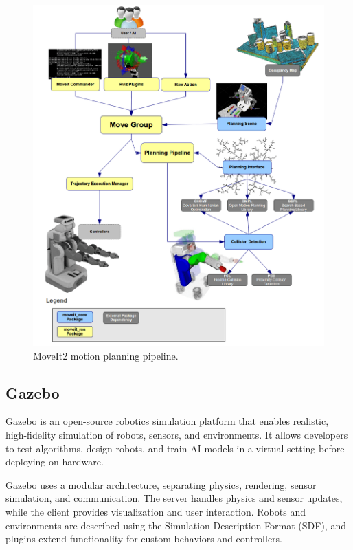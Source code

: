 \documentclass[12pt]{extarticle}
\begin{document}
\begin{figure}[htbp]
    \centering
    \includegraphics[width=\linewidth]{images/moveit_pipeline.png}
    \caption{MoveIt2 motion planning pipeline.}
    \label{fig:moveit_pipeline}
\end{figure}

\subsection{Gazebo}

Gazebo is an open-source robotics simulation platform that enables realistic, high-fidelity simulation of robots, sensors, and environments. It allows developers to test algorithms, design robots, and train AI models in a virtual setting before deploying on hardware.

Gazebo uses a modular architecture, separating physics, rendering, sensor simulation, and communication. The server handles physics and sensor updates, while the client provides visualization and user interaction. Robots and environments are described using the Simulation Description Format (SDF), and plugins extend functionality for custom behaviors and controllers.
\end{document}

